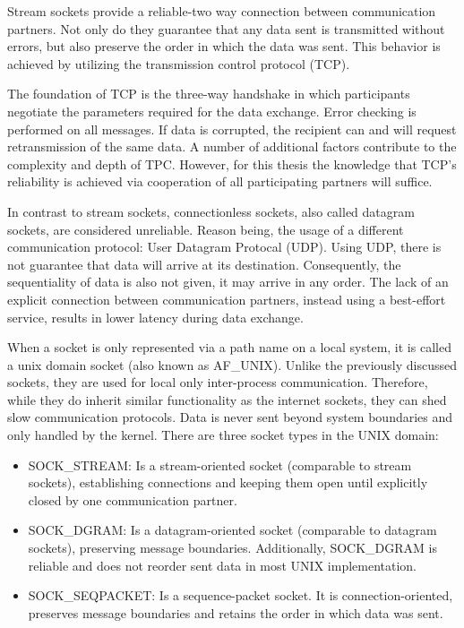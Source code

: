 Stream sockets provide a reliable-two way connection between communication partners.
Not only do they guarantee that any data sent is transmitted without errors, but also preserve the order in which the data was sent.
This behavior is achieved by utilizing the transmission control protocol (TCP).\cite{beej:sockets}

The foundation of TCP is the three-way handshake in which participants negotiate the parameters required for the data exchange.
Error checking is performed on all messages.
If data is corrupted, the recipient can and will request retransmission of the same data.
A number of additional factors contribute to the complexity and depth of TPC.
However, for this thesis the knowledge that TCP's reliability is achieved via cooperation of all participating partners will suffice.

In contrast to stream sockets, connectionless sockets, also called datagram sockets, are considered unreliable.
Reason being, the usage of a different communication protocol\@: User Datagram Protocal (UDP).
Using UDP, there is not guarantee that data will arrive at its destination.
Consequently, the sequentiality of data is also not given, it may arrive in any order.
The lack of an explicit connection between communication partners, instead using a best-effort service, results in lower latency during data exchange.\cite{beej:sockets}

When a socket is only represented via a path name on a local system, it is called a unix domain socket (also known as AF\_UNIX).
Unlike the previously discussed sockets, they are used for local only inter-process communication.
Therefore, while they do inherit similar functionality as the internet sockets, they can shed slow communication protocols.
Data is never sent beyond system boundaries and only handled by the kernel.
There are three socket types in the UNIX domain\cite{man:unixsockets}:
\begin{itemize}
    \itemsep0em
    \item SOCK\_STREAM\@: Is a stream-oriented socket (comparable to stream sockets), establishing connections and keeping them open until explicitly closed by one communication partner.
    \item SOCK\_DGRAM\@: Is a datagram-oriented socket (comparable to datagram sockets), preserving message boundaries. Additionally, SOCK\_DGRAM is reliable and does not reorder sent data in most UNIX implementation.
    \item SOCK\_SEQPACKET\@: Is a sequence-packet socket. It is connection-oriented, preserves message boundaries and retains the order in which data was sent.
\end{itemize}

